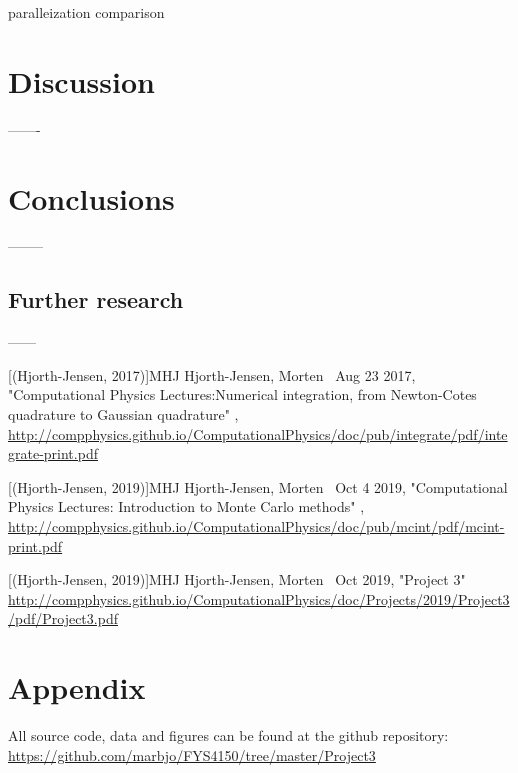 \documentclass{emulateapj}
\begin{document}
paralleization comparison



\section{Discussion}
\label{sec:discussion}
-------

\section{Conclusions}
\label{sec:conclusions}
--------


\subsection{Further research}
------

\newpage
\begin{thebibliography}{}

[(Hjorth-Jensen, 2017)]{MHJ} Hjorth-Jensen, Morten \, Aug 23 2017, "Computational Physics Lectures:Numerical integration, from Newton-Cotes quadrature to Gaussian quadrature" , \url{http://compphysics.github.io/ComputationalPhysics/doc/pub/integrate/pdf/integrate-print.pdf}

[(Hjorth-Jensen, 2019)]{MHJ} Hjorth-Jensen, Morten \, Oct 4 2019, "Computational Physics Lectures: Introduction to Monte Carlo methods" , \url{http://compphysics.github.io/ComputationalPhysics/doc/pub/mcint/pdf/mcint-print.pdf}

[(Hjorth-Jensen, 2019)]{MHJ} Hjorth-Jensen, Morten \, Oct 2019, "Project 3"
\url{http://compphysics.github.io/ComputationalPhysics/doc/Projects/2019/Project3/pdf/Project3.pdf}

\end{thebibliography}

\section{Appendix}
All source code, data and figures can be found at the github repository: \url{https://github.com/marbjo/FYS4150/tree/master/Project3}
\end{document}

